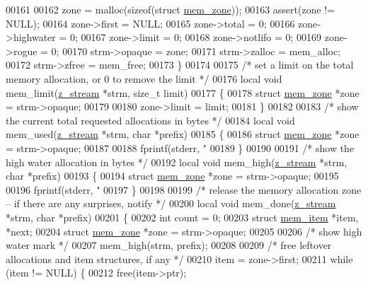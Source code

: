 \begin{DoxyCode}
00161 
00162     zone = malloc(\textcolor{keyword}{sizeof}(\textcolor{keyword}{struct} \hyperlink{structmem__zone}{mem\_zone}));
00163     assert(zone != NULL);
00164     zone->first = NULL;
00165     zone->total = 0;
00166     zone->highwater = 0;
00167     zone->limit = 0;
00168     zone->notlifo = 0;
00169     zone->rogue = 0;
00170     strm->opaque = zone;
00171     strm->zalloc = mem\_alloc;
00172     strm->zfree = mem\_free;
00173 \}
00174 
00175 \textcolor{comment}{/* set a limit on the total memory allocation, or 0 to remove the limit */}
00176 local \textcolor{keywordtype}{void} mem\_limit(\hyperlink{structz__stream__s}{z\_stream} *strm, \textcolor{keywordtype}{size\_t} limit)
00177 \{
00178     \textcolor{keyword}{struct }\hyperlink{structmem__zone}{mem\_zone} *zone = strm->opaque;
00179 
00180     zone->limit = limit;
00181 \}
00182 
00183 \textcolor{comment}{/* show the current total requested allocations in bytes */}
00184 local \textcolor{keywordtype}{void} mem\_used(\hyperlink{structz__stream__s}{z\_stream} *strm, \textcolor{keywordtype}{char} *prefix)
00185 \{
00186     \textcolor{keyword}{struct }\hyperlink{structmem__zone}{mem\_zone} *zone = strm->opaque;
00187 
00188     fprintf(stderr, \textcolor{stringliteral}{"%
00189 \}
00190 
00191 \textcolor{comment}{/* show the high water allocation in bytes */}
00192 local \textcolor{keywordtype}{void} mem\_high(\hyperlink{structz__stream__s}{z\_stream} *strm, \textcolor{keywordtype}{char} *prefix)
00193 \{
00194     \textcolor{keyword}{struct }\hyperlink{structmem__zone}{mem\_zone} *zone = strm->opaque;
00195 
00196     fprintf(stderr, \textcolor{stringliteral}{"%
00197 \}
00198 
00199 \textcolor{comment}{/* release the memory allocation zone -- if there are any surprises, notify */}
00200 local \textcolor{keywordtype}{void} mem\_done(\hyperlink{structz__stream__s}{z\_stream} *strm, \textcolor{keywordtype}{char} *prefix)
00201 \{
00202     \textcolor{keywordtype}{int} count = 0;
00203     \textcolor{keyword}{struct }\hyperlink{structmem__item}{mem\_item} *item, *next;
00204     \textcolor{keyword}{struct }\hyperlink{structmem__zone}{mem\_zone} *zone = strm->opaque;
00205 
00206     \textcolor{comment}{/* show high water mark */}
00207     mem\_high(strm, prefix);
00208 
00209     \textcolor{comment}{/* free leftover allocations and item structures, if any */}
00210     item = zone->first;
00211     \textcolor{keywordflow}{while} (item != NULL) \{
00212         free(item->ptr);
}}
\end{DoxyCode}
